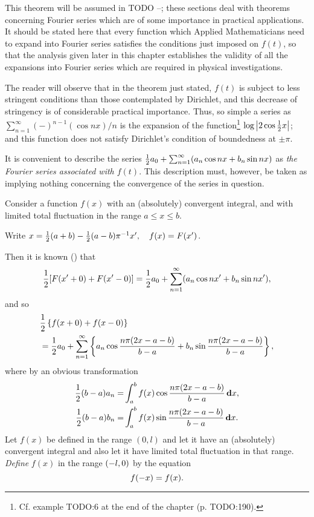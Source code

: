 This theorem will be assumed in
TODO --;
these sections deal with theorems concerning Fourier series which
are of some importance
in practical applications. It should be stated here that every
function which Applied Mathematicians need to expand into Fourier
series satisfies the conditions just imposed on $f(t)$, so that the
analysis given later in this chapter establishes the validity of all
the expansions into Fourier series which are required in physical
investigations.

The reader will observe that in the theorem just stated,
$f(t)$ is subject to less stringent conditions than those contemplated by
Dirichlet, and this decrease of stringency is of
considerable practical importance. Thus, so simple a series as
$\sum_{n=1}^{\infty} (-)^{n-1} (\cos nx) / n$
is the
expansion of the function\footnote{Cf. example TODO:6 at the end of the chapter (p. TODO:190).}
$\log \absval{2 \cos \half x}$; and this function
does not satisfy Dirichlet's condition of boundedness at $\pm \pi$.

It is convenient to describe the series
$\half a_{0} + \sum_{n=1}^{\infty} (a_{n} \cos nx + b_{n} \sin nx)$
as \emph{the Fourier series associated with $f(t)$}. This description must,
however, be
%
%
taken as implying nothing concerning the convergence of the series in
question.


Consider a function $f(x)$ with an (absolutely) convergent integral,
and with limited total fluctuation in the range $a \leq x \leq b$.

Write
$x = \half (a + b) - \half (a-b) \pi^{-1} x',
\quad
f(x) = F(x')$.

Then it is known () that
$$
\half [F(x'+0) + F(x'-0)]
=
\half a_{0} + \sum_{n=1}^{\infty} (a_{n} \cos nx' + b_{n} \sin nx'),
$$
and so
\begin{align*}
  & \half \thebrace{ f(x+0) + f(x-0)}
  \\
  &
  \hfill
  =
  \half a_{0}
  +
  \sum_{n=1}^{\infty}
  \thebrace{
    a_{n} \cos \frac{n \pi (2x-a-b)}{b-a}
    +
    b_{n} \sin \frac{n \pi (2x-a-b)}{b-a}
  },
\end{align*}
where by an obvious transformation
\begin{align*}
  \half (b-a) a_{n} =& \int_{a}^{b} f(x) \cos \frac{n \pi (2x-a-b)}{b-a} \dmeasure x,
  \\
  \half (b-a) b_{n} =& \int_{a}^{b} f(x) \sin \frac{n \pi (2x-a-b)}{b-a} \dmeasure x
  .
\end{align*}
Let $f(x)$ be defined in the range $(0,l)$ and let it have an
(absolutely) convergent integral and also let it have limited
total fluctuation in that range.
\emph{Define} $f(x)$ in the range
$\wandwtypo{(0,-l)}{(-l,0)}$
by the equation
$$
f(-x) = f(x).\index{Even functions}
$$

